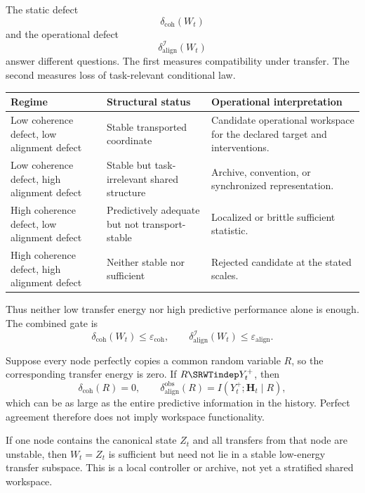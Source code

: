 
The static defect
\[
\delta_{\mathrm{coh}}(W_t)
\]
and the operational defect
\[
\delta_{\mathrm{align}}^{\mathcal I}(W_t)
\]
answer different questions. The first measures compatibility under transfer.
The second measures loss of task-relevant conditional law.

\begin{center}
\small
\begin{tabularx}{\textwidth}{@{}>{\raggedright\arraybackslash}p{}>{\raggedright\arraybackslash}p{}>{\raggedright\arraybackslash}X@{}}
\toprule
Regime & Structural status & Operational interpretation \\
\midrule
Low coherence defect, low alignment defect & Stable transported coordinate &
Candidate operational workspace for the declared target and interventions. \\
Low coherence defect, high alignment defect & Stable but task-irrelevant
shared structure & Archive, convention, or synchronized representation. \\
High coherence defect, low alignment defect & Predictively adequate but not
transport-stable & Localized or brittle sufficient statistic. \\
High coherence defect, high alignment defect & Neither stable nor sufficient &
Rejected candidate at the stated scales. \\
\bottomrule
\end{tabularx}
\end{center}

Thus neither low transfer energy nor high predictive performance alone is
enough. The combined gate is
\[
\boxed{
\delta_{\mathrm{coh}}(W_t)
\leq
\varepsilon_{\mathrm{coh}},
\qquad
\delta_{\mathrm{align}}^{\mathcal I}(W_t)
\leq
\varepsilon_{\mathrm{align}}.
}
\]

\begin{SRWTexample}
Suppose every node perfectly copies a common random variable \(R\), so the
corresponding transfer energy is zero. If \(R\SRWTindep Y_t^+\), then
\[
\delta_{\mathrm{coh}}(R)=0,
\qquad
\delta_{\mathrm{align}}^{\mathrm{obs}}(R)
=I(Y_t^+;\mathbf H_t\mid R),
\]
which can be as large as the entire predictive information in the history.
Perfect agreement therefore does not imply workspace functionality.
\end{SRWTexample}

\begin{SRWTexample}
If one node contains the canonical state \(Z_t\) and all transfers from that
node are unstable, then \(W_t=Z_t\) is sufficient but need not lie in a stable
low-energy transfer subspace. This is a local controller or archive, not yet a
stratified shared workspace.
\end{SRWTexample}

